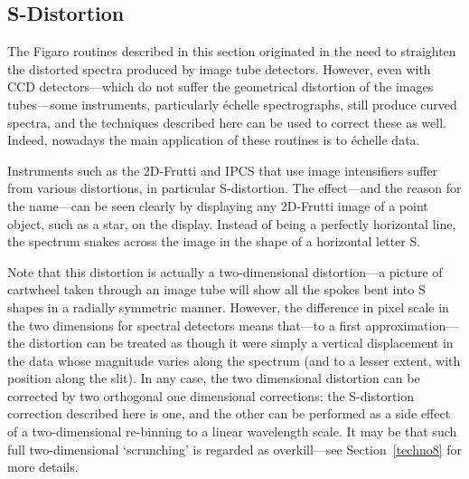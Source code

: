 \documentclass[11pt,twoside]{article}
\newcommand{\stardocinitials}  {SUN}
\newcommand{\stardocnumber}    {86.21}
\newcommand{\stardocname}{\stardocinitials /\stardocnumber}
\newcommand{\htmlref}[2]{#1}
\newcommand{\xlabel}[1]{}
\newcommand{\latorhtm}[2]{#1}
\newcommand{\latorhtm}[2]{#2}
\begin{document}

\subsection{\xlabel{s_distortion}\label{techno7}S-Distortion}
\markboth{More complex things: S-distortion}{\stardocname}

   The Figaro routines described in this section originated in the need
   to straighten the distorted spectra produced by image tube detectors.
   However, even with CCD detectors\latorhtm{---}{-}which do not suffer the
   geometrical distortion of the images tubes\latorhtm{---}{-}some instruments,
   particularly \'echelle spectrographs, still produce curved spectra, and
   the techniques described here can be used to correct these as well.
   Indeed, nowadays the main application of these routines is to \'echelle
   data.

   Instruments such as the 2D-Frutti and IPCS that use image
   intensifiers suffer from various distortions, in particular
   S-distortion.  The effect\latorhtm{---}{-}and the reason for the
   name\latorhtm{---}{-}can be seen
   clearly by displaying any 2D-Frutti image of a point object, such as
   a star, on the display. Instead of being a perfectly horizontal line,
   the spectrum snakes across the image in the shape of a horizontal
   letter S.

   Note that this distortion is actually a two-dimensional
   distortion\latorhtm{---}{-}a picture of cartwheel taken through an image
   tube will show all the
   spokes bent into S shapes in a radially symmetric manner.  However,
   the difference in pixel scale in the two dimensions for spectral
   detectors means that\latorhtm{---}{-}to a first
   approximation\latorhtm{---}{-}the distortion can
   be treated as though it were simply a vertical displacement in the
   data whose magnitude varies along the spectrum (and to a lesser
   extent, with position along the slit). In any case, the two
   dimensional distortion can be corrected by two orthogonal one
   dimensional corrections: the S-distortion correction described here
   is one, and the other can be performed as a side effect of a
   two-dimensional re-binning to a linear wavelength scale.  It may be
   that such full two-dimensional `scrunching' is regarded as
   overkill\latorhtm{---}{-}see
   \latorhtm{Section~\ref{techno8}}
   {the section on \htmlref{wavelengths}{techno8}}
   for more details.
\end{document}
